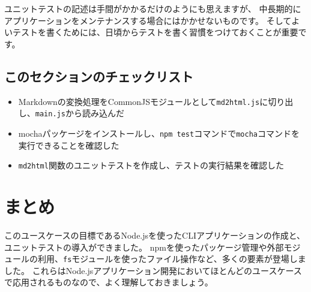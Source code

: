 ユニットテストの記述は手間がかかるだけのようにも思えますが、
中長期的にアプリケーションをメンテナンスする場合にはかかせないものです。
そしてよいテストを書くためには、日頃からテストを書く習慣をつけておくことが重要です。

\hypertarget{section-checklist}{%
\subsection{このセクションのチェックリスト}\label{section-checklist}}

\begin{itemize}
\item
  Markdownの変換処理をCommonJSモジュールとして\texttt{md2html.js}に切り出し、\texttt{main.js}から読み込んだ
\item
  mochaパッケージをインストールし、\texttt{npm test}コマンドで\texttt{mocha}コマンドを実行できることを確認した
\item
  \texttt{md2html}関数のユニットテストを作成し、テストの実行結果を確認した
\end{itemize}

\hypertarget{unit-test-summary}{%
\section{まとめ}\label{unit-test-summary}}

このユースケースの目標であるNode.jsを使ったCLIアプリケーションの作成と、ユニットテストの導入ができました。
npmを使ったパッケージ管理や外部モジュールの利用、\texttt{fs}モジュールを使ったファイル操作など、多くの要素が登場しました。
これらはNode.jsアプリケーション開発においてほとんどのユースケースで応用されるものなので、よく理解しておきましょう。
